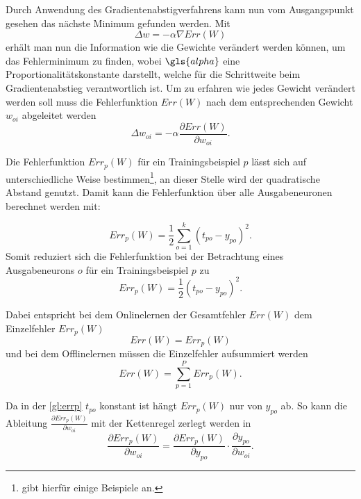 Durch Anwendung des Gradientenabstigverfahrens kann nun vom Ausgangspunkt gesehen das nächste Minimum gefunden werden. Mit
\begin{equation}
\Delta w = - \alpha \nabla Err(W)
\end{equation}
erhält man nun die Information wie die Gewichte verändert werden können, um das Fehlerminimum zu finden,
wobei $\gls{alpha}$ eine Proportionalitätskonstante darstellt, welche für die Schrittweite beim Gradientenabstieg verantwortlich ist.
Um zu erfahren wie jedes Gewicht verändert werden soll muss die Fehlerfunktion $Err(W)$ nach dem entsprechenden Gewicht $w_{oi}$ abgeleitet werden
\begin{equation}
\Delta w_{oi} = - \alpha \frac{\partial Err(W)}{\partial w_{oi}} .
\label{gl:gewaend}
\end{equation}
\begin{sloppypar}
Die Fehlerfunktion $Err_p(W)$ für ein Trainingsbeispiel $p$ lässt sich auf unterschiedliche Weise bestimmen\footnote{\citet[60 f]{dkriesel07} gibt hierfür einige Beispiele an.}, an dieser Stelle wird der quadratische Abstand genutzt. Damit kann die \hbox{Fehlerfunktion} über alle Ausgabeneuronen berechnet werden mit:
\end{sloppypar}
\begin{equation}
Err_p(W)= \frac{1}{2} \sum^k_{o=1} (t_{po}-y_{po})^2 .
\end{equation}
Somit reduziert sich die Fehlerfunktion bei der Betrachtung eines Ausgabeneurons $o$ für ein Trainingsbeispiel $p$ zu
\begin{equation}
Err_p(W)= \frac{1}{2} (t_{po}-y_{po})^2 .
\label{gl:errp}
\end{equation}


Dabei entspricht bei dem Onlinelernen der Gesamtfehler $Err(W)$ dem Einzelfehler $Err_p(W)$
\begin{equation}
Err(W)=Err_p(W) 
\end{equation}
und bei dem Offlinelernen müssen die Einzelfehler aufsummiert werden
\begin{equation}
Err(W)= \sum^P_{p=1} Err_p(W). 
\end{equation}

Da in der \autoref{gl:errp} $t_{po}$ konstant ist hängt $Err_p(W)$ nur von $y_{po}$ ab. So kann die Ableitung $\frac{\partial Err_p(W)}{\partial w_{oi}}$ mit der Kettenregel zerlegt werden in
\begin{equation}
\frac{\partial Err_p(W)}{\partial w_{oi}}= \frac{\partial Err_p(W)}{\partial y_{po}} \cdot \frac{\partial y_{po}}{\partial w_{oi}}.
\label{gl:zerlket}
\end{equation}

